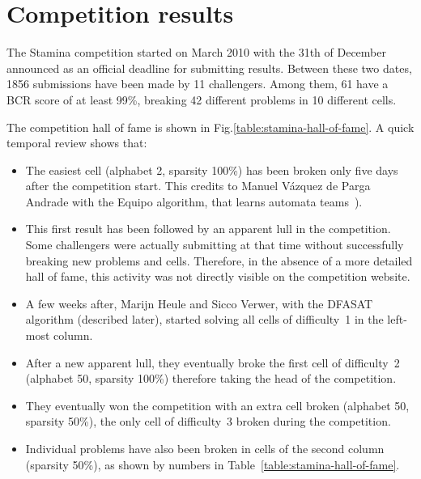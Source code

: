 \section{Competition results\label{section:stamina-results}}

The Stamina competition started on March 2010 with the 31th of December announced as an official deadline for submitting results. Between these two dates, 1856 submissions have been made by 11 challengers. Among them, 61 have a BCR score of at least 99\%, breaking 42 different problems in 10 different cells.

The competition hall of fame is shown in Fig.\ref{table:stamina-hall-of-fame}. A quick temporal review shows that:
\begin{itemize} 
\item The easiest cell (alphabet 2, sparsity 100\%) has been broken only five days after the competition start. This credits to Manuel V\'azquez de Parga Andrade with the Equipo algorithm, that learns automata teams~\cite{Garcia:2010}). 
\item This first result has been followed by an apparent lull in the competition. Some challengers were actually submitting at that time without successfully breaking new problems and cells. Therefore, in the absence of a more detailed hall of fame, this activity was not directly visible on the competition website. 
\item A few weeks after, Marijn Heule and Sicco Verwer, with the DFASAT algorithm (described later), started solving all cells of difficulty~1 in the left-most column. 
\item After a new apparent lull, they eventually broke the first cell of difficulty~2 (alphabet 50, sparsity 100\%) therefore taking the head of the competition. 
\item They eventually won the competition with an extra cell broken (alphabet 50, sparsity 50\%), the only cell of difficulty~3 broken during the competition. 
\item Individual problems have also been broken in cells of the second column (sparsity 50\%), as shown by numbers in Table~\ref{table:stamina-hall-of-fame}.
\end{itemize}

